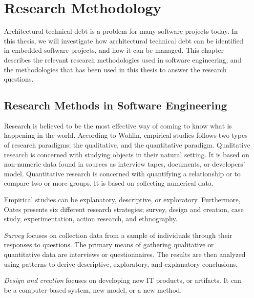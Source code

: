 
\chapter{Research Methodology}
Architectural technical debt is a problem for many software projects today. In this thesis, we will investigate how architectural technical debt can be identified in embedded software projects, and how it can be managed. This chapter describes the relevant research methodologies used in software engineering, and the methodologies that has been used in this thesis to answer the research questions. 



\section{Research Methods in Software Engineering}
Research is believed to be the most effective way of coming to know what is happening in the world\cite{bassey2003case}. According to Wohlin\cite{Wohlin:2000:ESE:330775}, empirical studies follows two types of research paradigms; the qualitative, and the quantitative paradigm. Qualitative research is concerned with studying objects in their natural setting\cite{Wohlin:2000:ESE:330775}. It is based on non-numeric data found in sources as interview tapes, documents, or developers' model. Quantitative research is concerned with quantifying a relationship or to compare two or more groups\cite{Wohlin:2000:ESE:330775}. It is based on collecting numerical data. 



Empirical studies can be explanatory, descriptive, or exploratory. Furthermore, Oates\cite{Oates:2006:RIS:1202299} presents six different research strategies; survey, design and creation, case study, experimentation, action research, and ethnography. 

\textit{{Survey}} focuses on collection data from a sample of individuals through their responses to questions. The primary means of gathering qualitative or quantitative data are interviews or questionnaires. The results are then analyzed using patterns to derive descriptive, exploratory, and explanatory conclusions. 

\textit{{Design and creation}} focuses on developing new IT products, or artifacts. It can be a computer-based system, new model, or a new method. 


